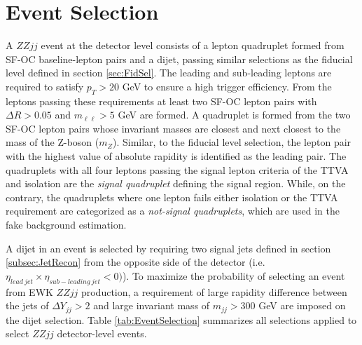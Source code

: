 \section{Event Selection}
\label{sec:EventSel}

A $ZZjj$ event at the detector level consists of a lepton quadruplet formed from SF-OC baseline-lepton pairs and a dijet, passing similar selections as the fiducial level defined in section \ref{sec:FidSel}. The leading and sub-leading leptons are required to satisfy $p_{T} > 20$ GeV to ensure a high trigger efficiency. From the leptons passing these requirements at least two SF-OC lepton pairs with $\Delta R > 0.05$ and $m_{\ell\ell} > 5$ GeV are formed. A quadruplet is formed from the two SF-OC lepton pairs whose invariant masses are closest and next closest to the mass of the Z-boson ($m_{Z}$). Similar, to the fiducial level selection, the lepton pair with the highest value of absolute rapidity is identified as the leading pair. The quadruplets with all four leptons passing the signal lepton criteria of the TTVA and isolation are the \textit{signal quadruplet} defining the signal region. While, on the contrary, the quadruplets where one lepton fails either isolation or the TTVA requirement are categorized as a \textit{not-signal quadruplets}, which are used in the fake background estimation. 

A dijet in an event is selected by requiring two signal jets defined in section \ref{subsec:JetRecon} from the opposite side of the detector (i.e. $\eta_{lead~jet} \times \eta_{sub-leading~jet} < 0)$). To maximize the probability of selecting an event from EWK $ZZjj$ production, a requirement of large rapidity difference between the jets of $\Delta Y_{jj}> 2 $ and large invariant mass of $m_{jj} > 300 $ GeV are imposed on the dijet selection. Table \ref{tab:EventSelection} summarizes all selections applied to select  $ZZjj$ detector-level events.


